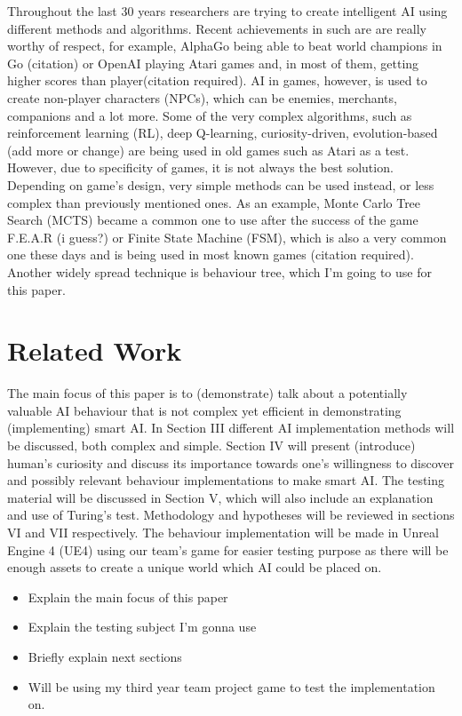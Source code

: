 \documentclass[journal]{IEEEtran}
\begin{document}
Throughout the last 30 years researchers are trying to create intelligent AI using different methods and algorithms. Recent achievements in such are are really worthy of respect, for example, AlphaGo being able to beat world champions in Go (citation) or OpenAI playing Atari games and, in most of them, getting higher scores than player(citation required). AI in games, however, is used to create non-player characters (NPCs), which can be enemies, merchants, companions and a lot more. Some of the very complex algorithms, such as reinforcement learning (RL), deep Q-learning, curiosity-driven, evolution-based (add more or change) are being used in old games such as Atari as a test. However, due to specificity of games, it is not always the best solution. Depending on game's design, very simple methods can be used instead, or less complex than previously mentioned ones. As an example, Monte Carlo Tree Search (MCTS) became a common one to use after the success of the game F.E.A.R (i guess?) or Finite State Machine (FSM), which is also a very common one these days and is being used in most known games (citation required). Another widely spread technique is behaviour tree, which I'm going to use for this paper.

\section{Related Work} %
The main focus of this paper is to (demonstrate) talk about a potentially valuable AI behaviour that is not complex yet efficient in demonstrating (implementing) smart AI. In Section III different AI implementation methods will be discussed, both complex and simple. Section IV will present (introduce) human's curiosity and discuss its importance towards one's willingness to discover and possibly relevant behaviour implementations to make smart AI. The testing material will be discussed in Section V, which will also include an explanation and use of Turing's test. Methodology and hypotheses will be reviewed in sections VI and VII respectively. The behaviour implementation will be made in Unreal Engine 4 (UE4) using our team's game for easier testing purpose as there will be enough assets to create a unique world which AI could be placed on.
\begin{itemize}
	\item Explain the main focus of this paper
	\item Explain the testing subject I'm gonna use
	\item Briefly explain next sections
	\item Will be using my third year team project game to test the implementation on.
\end{itemize}
\end{document}
